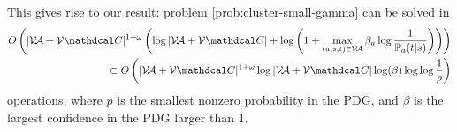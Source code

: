 \documentclass[twoside]{article}
\begin{document}
\begin{lproof}
    This gives rise to our result: problem \eqref{prob:cluster-small-gamma} can be solved in 
    \begin{align*}
        O\left( |\V \!\Ar + \V \mathdcal C|^{1+\omega} 
            \left(\log |\V \!\Ar + \V \mathdcal C| + \log\left(1 + \max_{(a,s,t) \in \V\!\Ar} \beta_a \log \frac{1}{\p_a(t|s)} \right) \right)  \right) \\
        \subset 
        O\left( |\V \!\Ar + \V \mathdcal C|^{1+ \omega} 
            \log |\V \!\Ar + \V \mathdcal C|
            \log (\beta ) \log\log \frac{1}{p} \right)
    \end{align*}
    operations, where $p$ is the smallest nonzero probability in the PDG, and $\beta$ is the largest confidence in the PDG larger than 1.
\end{lproof}
\end{document}
